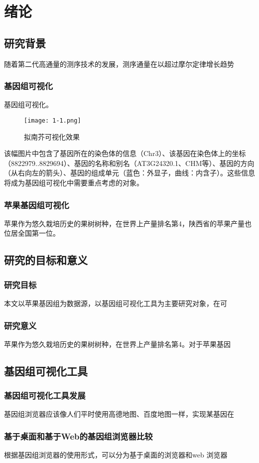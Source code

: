 \chapter{绪论}
	\section{研究背景}
	随着第二代高通量的测序技术的发展，测序通量在以超过摩尔定律增长趋势
		\subsection{基因组可视化}
		基因组可视化。
		\begin{figure}
			\centering
			\texttt{[image: 1-1.png]}
			\caption{拟南芥可视化效果}
		\end{figure}
		该幅图片中包含了基因所在的染色体的信息（Chr3）、该基因在染色体上的坐标（8822979..8829694）、基因的名称和别名（AT3G24320.1、CHM等）、基因的方向（从右向左的箭头）、基因的组成单元（蓝色：外显子，曲线：内含子）。这些信息将成为基因组可视化中需要重点考虑的对象。
		\subsection{苹果基因组可视化}
		苹果作为悠久栽培历史的果树树种，在世界上产量排名第4，陕西省的苹果产量也位居全国第一位。
	\section{研究的目标和意义}
		\subsection{研究目标}
		本文以苹果基因组为数据源，以基因组可视化工具为主要研究对象，在可
		\subsection{研究意义}
		苹果作为悠久栽培历史的果树树种，在世界上产量排名第4。对于苹果基因
	\section{基因组可视化工具}
		\subsection{基因组可视化工具发展}
	基因组浏览器应该像人们平时使用高德地图、百度地图一样，实现某基因在
		\subsection{基于桌面和基于Web的基因组浏览器比较}
		根据基因组浏览器的使用形式，可以分为基于桌面的浏览器和web 浏览器
